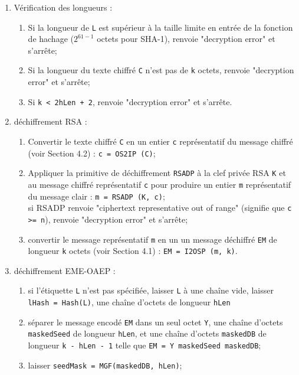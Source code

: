 \begin{enumerate}
\item Vérification des longueurs :
\begin{enumerate}
      \item Si la longueur de \texttt{L} est supérieur à la taille limite en entrée de la fonction de hachage (\texttt{$2^{61 - 1}$} octets pour SHA-1), renvoie "decryption error" et s'arrête;
\item Si la longueur du texte chiffré \texttt{C} n'est pas de \texttt{k} octets, renvoie "decryption error" et s'arrête;
     \item Si \texttt{k < 2hLen + 2}, renvoie "decryption error" et s'arrête.\\
\end{enumerate}
\item déchiffrement RSA :
\begin{enumerate}
      \item Convertir le texte chiffré \texttt{C} en un entier \texttt{c} représentatif du message chiffré (voir Section 4.2) : \texttt{c = OS2IP (C)};
      \item Appliquer la primitive de déchiffrement \texttt{RSADP} à la clef privée RSA \texttt{K} et au message chiffré représentatif \texttt{c} pour produire un entier \texttt{m} représentatif du message clair : \texttt{m = RSADP (K, c)};\\
       si RSADP renvoie "ciphertext representative out of range" (signifie que \texttt{c >= n}), renvoie "decryption error" et s'arrête;
       \item convertir le message représentatif \texttt{m} en un un message déchiffré \texttt{EM} de longueur \texttt{k} octets (voir Section 4.1) : \texttt{EM = I2OSP (m, k)}.\\
\end{enumerate}
\item déchiffrement EME-OAEP :
\begin{enumerate}
      \item si l'étiquette \texttt{L} n'est pas spécifiée, laisser \texttt{L} à une chaîne vide, laisser \texttt{lHash = Hash(L)}, une chaîne d'octets de longueur \texttt{hLen}
       \item séparer le message encodé \texttt{EM} dans un seul octet \texttt{Y}, une chaîne d'octets \texttt{maskedSeed} de longueur \texttt{hLen}, et une chaîne d'octets \texttt{maskedDB} de longueur \texttt{k - hLen - 1} telle que \texttt{EM = Y \textbar\textbar maskedSeed \textbar\textbar maskedDB};
       \item laisser \texttt{seedMask = MGF(maskedDB, hLen)};

\end{enumerate}
\end{enumerate}
